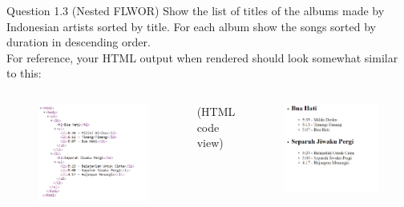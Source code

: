 \begin{frame}[fragile]{Question 1.3 (Nested FLWOR)}
Show the list of titles of the albums made by Indonesian artists sorted by title. For each album show the songs sorted by duration in descending order.\\\vspace{5pt}
For reference, your HTML output when rendered should look somewhat similar to this: \\\vspace{-5pt}
\begin{columns}
\begin{figure}
	\includegraphics[width=1\textwidth,frame]{4221-t8/q3-output.png}
\end{figure}\vspace{-5pt}
(HTML code view)
\begin{figure}
	\includegraphics[width=1\textwidth,frame]{4221-t8/q3-output-direct.png}

\end{figure}
\end{columns}
\end{frame}
